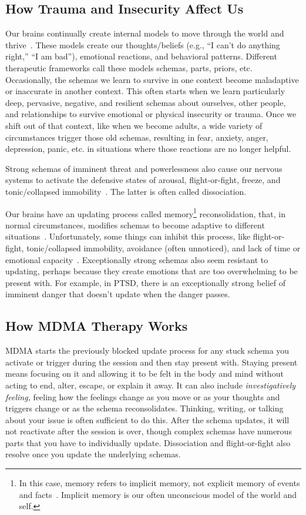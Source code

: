 \documentclass[11pt,oneside]{book}
\let\cite\parencite
\newcommand{\mdcite}[1]{}
\begin{document}
\subsection*{How Trauma and Insecurity Affect Us}
Our brains continually create internal models to move through the world and thrive~\mdcite{eckerUnlocking}. These models create our thoughts/beliefs (e.g., \enquote{I can't do anything right,} \enquote{I am bad}), emotional reactions, and behavioral patterns. Different therapeutic frameworks call these models schemas, parts, priors, etc. Occasionally, the schemas we learn to survive in one context become maladaptive or inaccurate in another context. This often starts when we learn particularly deep, pervasive, negative, and resilient schemas about ourselves, other people, and relationships to survive emotional or physical insecurity or trauma. Once we shift out of that context, like when we become adults, a wide variety of circumstances trigger those old schemas, resulting in fear, anxiety, anger, depression, panic, etc. in situations where those reactions are no longer helpful.

Strong schemas of imminent threat and powerlessness also cause our nervous systems to activate the defensive states of arousal, flight-or-fight, freeze, and tonic/collapsed immobility~\mdcite{kozlowskaDefenseCascade}. The latter is often called dissociation.

Our brains have an updating process called memory\footnote{In this case, memory refers to implicit memory, not explicit memory of events and facts~\cite{eckerUnlocking}. Implicit memory is our often unconscious model of the world and self.} reconsolidation, that, in normal circumstances, modifies schemas to become adaptive to different situations~\mdcite{eckerUnlocking}. Unfortunately, some things can inhibit this process, like flight-or-fight, tonic/collapsed immobility, avoidance (often unnoticed), and lack of time or emotional capacity~\mdcite{berghBSTS,kozlowskaDefenseCascade}. Exceptionally strong schemas also seem resistant to updating, perhaps because they create emotions that are too overwhelming to be present with. For example, in PTSD, there is an exceptionally strong belief of imminent danger that doesn't update when the danger passes.

\subsection*{How MDMA Therapy Works}
MDMA starts the previously blocked update process for any stuck schema you activate or trigger during the session and then stay present with. Staying present means focusing on it and allowing it to be felt in the body and mind without acting to end, alter, escape, or explain it away. It can also include \textit{investigatively feeling,} feeling how the feelings change as you move or as your thoughts and triggers change or as the schema reconsolidates. Thinking, writing, or talking about your issue is often sufficient to do this. After the schema updates, it will not reactivate after the session is over, though complex schemas have numerous parts that you have to individually update. Dissociation and flight-or-fight also resolve once you update the underlying schemas.
\end{document}
